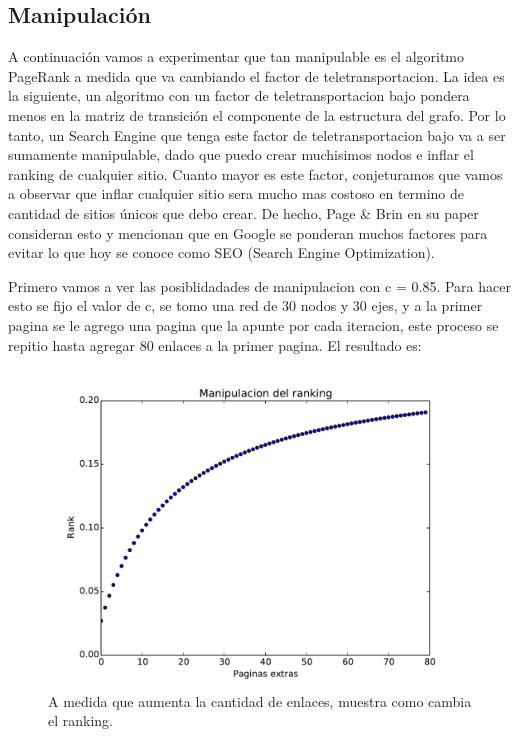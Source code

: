 \pagebreak
\subsection{Manipulación}

A continuación vamos a experimentar que tan manipulable es el algoritmo PageRank a medida que va cambiando el factor de teletransportacion. La idea es la siguiente, un algoritmo con un factor de teletransportacion bajo pondera menos en la matriz de transición el componente de la estructura del grafo. Por lo tanto, un Search Engine que tenga este factor de teletransportacion bajo va a ser sumamente manipulable, dado que puedo crear muchisimos nodos e inflar el ranking de cualquier sitio. Cuanto mayor es este factor, conjeturamos que vamos a observar que inflar cualquier sitio sera mucho mas costoso en termino de cantidad de sitios únicos que debo crear. De hecho, Page \& Brin en su paper consideran esto y mencionan que en Google se ponderan muchos factores para evitar lo que hoy se conoce como SEO (Search Engine Optimization).

Primero vamos a ver las posiblidadades de manipulacion con c = 0.85. Para hacer esto se fijo el valor de c, se tomo una red de 30 nodos y 30 ejes, y a la primer pagina se le agrego una pagina que la apunte por cada iteracion, este proceso se repitio hasta agregar 80 enlaces a la primer pagina. El resultado es:

\begin{figure}[H]
\centering
\includegraphics[scale=0.7]{images/manipulacion.pdf}
\caption{A medida que aumenta la cantidad de enlaces, muestra como cambia el ranking.}
\label{timePageRank}
\end{figure}

